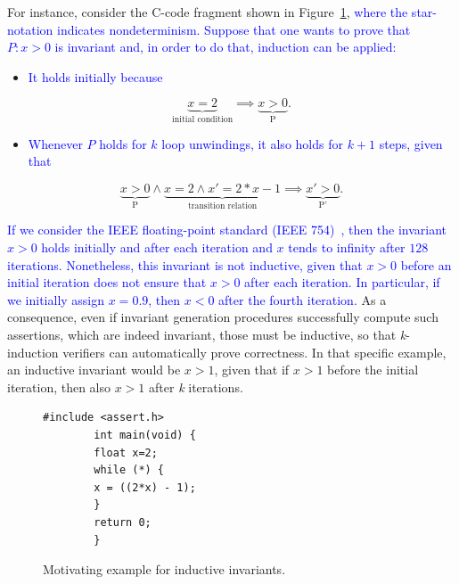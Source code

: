 \documentclass{cta-author}
\begin{document}
For instance, consider the C-code fragment shown in Figure~\ref{figure:inductive-invariant}, \textcolor{blue}{where the star-notation indicates nondeterminism. Suppose that one wants to prove that $P : x > 0$ is invariant and, in order to do that, induction can be applied:}

\begin{itemize} 
	\item \textcolor{blue}{It holds initially because}
\end{itemize}

\begin{equation}
\underbrace{x = 2}_{\text{initial condition}} \implies \underbrace{x > 0}_{\text{P}}. \nonumber
\end{equation}

\begin{itemize} 
	\item \textcolor{blue}{Whenever $P$ holds for $k$ loop unwindings, it also holds for $k + 1$ steps, given that}
\end{itemize}

\begin{equation}
\underbrace{x > 0}_{\text{P}} \wedge \underbrace{x = 2 \wedge x' = 2*x - 1}_{\text{transition relation}} \implies \underbrace{x' > 0}_{\text{P'}}. \nonumber
\end{equation}

\textcolor{blue}{If we consider the IEEE floating-point standard (IEEE 754)~\cite{4610935,Goldberg91whatevery}, then  the invariant $x>0$ holds initially and after each iteration and $x$ tends to infinity after $128$ iterations. Nonetheless, this invariant is not inductive, given that $x>0$ before an initial iteration does not ensure that $x>0$ after each iteration. In particular, if we initially assign $x=0.9$, then $x<0$ after the fourth iteration.} As a consequence, even if invariant generation procedures successfully compute such assertions, which are indeed invariant, those must be inductive, so that \textit{k}-induction verifiers can automatically prove correctness. In that specific example, an inductive invariant would be $x>1$, given that if $x>1$ before the initial iteration, then also $x>1$ after \textit{k} iterations.
%
\begin{figure}[h]
	\centering
	\begin{minipage}{0.35\textwidth}
		\begin{lstlisting}[basicstyle=\footnotesize]
		#include <assert.h>
		int main(void) {
		float x=2;
		while (*) {
		x = ((2*x) - 1);
		}
		return 0;
		}
		\end{lstlisting}
	\end{minipage}
	\caption{Motivating example for inductive invariants.}
	\label{figure:inductive-invariant}
\end{figure}
\end{document}

